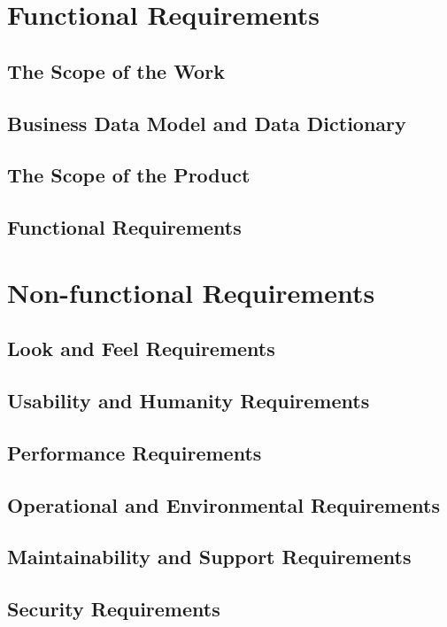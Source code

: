 \documentclass[12pt]{report}
\begin{document}
\chapter{Functional Requirements}\label{ch:Functional}
\section{The Scope of the Work}\label{sec:ScopeOfWork}
\section{Business Data Model and Data Dictionary}\label{sec:DataModel}
\section{The Scope of the Product}\label{sec:ScopeOfProduct}
\section{Functional Requirements}\label{sec:Functional}
\chapter{Non-functional Requirements}\label{ch:NonFunc}
\section{Look and Feel Requirements}\label{sec:LookAndFeel} 
\section{Usability and Humanity Requirements}\label{sec:Usability}
\section{Performance Requirements}\label{sec:Performance}
\section{Operational and Environmental Requirements}\label{sec:Operational}
\section{Maintainability and Support Requirements}\label{sec:Support}
\section{Security Requirements}\label{sec:Security}
\end{document}
